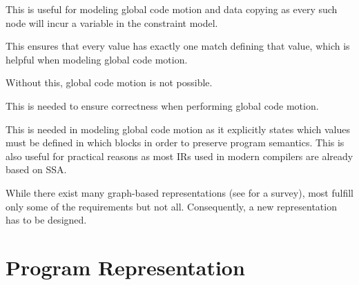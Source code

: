 \begin{requirements}
  \item {}
    This is useful for modeling \gls{global code motion} and \gls{data copying}
    as every such \gls{node} will incur a \gls{variable} in the \gls{constraint
      model}.

  \item {}
    This ensures that every value has exactly one \gls{match} defining that
    value, which is helpful when modeling \gls{global code motion}.

  \item {}
    Without this, \gls{global code motion} is not possible.

  \item {}
    This is needed to ensure correctness when performing \gls{global code
      motion}.

  \item {}
    This is needed in modeling \gls{global code motion} as it explicitly
    states which values must be defined in which \glspl{block} in order to
    preserve \gls{program} semantics.
    This is also useful for practical reasons as most \glspl{IR} used in modern
    \glspl{compiler} are already based on \gls{SSA}.
\end{requirements}

While there exist many \gls{graph}-based representations (see
\cite{StanierWatson:2013} for a survey), most fulfill only some of the
requirements but not all.
%
Consequently, a new representation has to be designed.


\section{Program Representation}

